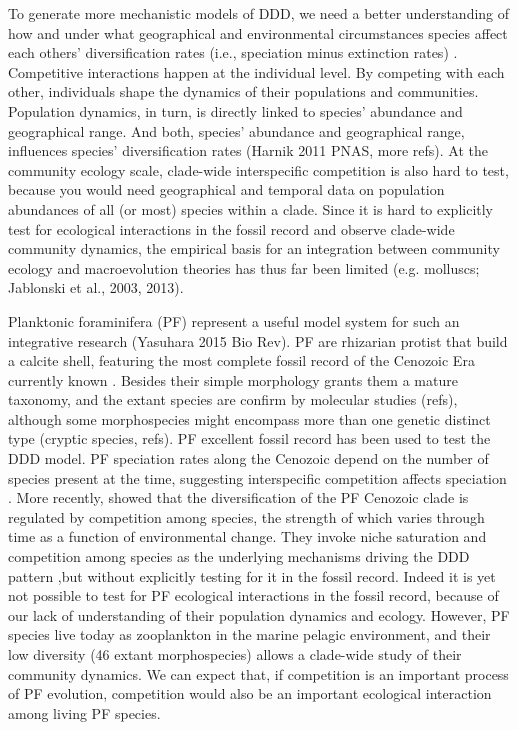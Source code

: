 To generate more mechanistic models of DDD, we need a better understanding of how and under what geographical and environmental circumstances species affect each others' diversification rates (i.e., speciation minus extinction rates) \citep{weber2017evolution}.  
Competitive interactions happen at the individual level. By competing with each other, individuals shape the dynamics of their populations and communities. Population dynamics, in turn, is directly linked to species' abundance and geographical range. And both, species' abundance and geographical range, influences species' diversification rates (Harnik 2011 PNAS, more refs). 
At the community ecology scale, clade-wide interspecific competition is also hard to test, because you would need geographical and temporal data on population abundances of all (or most) species within a clade. 
Since it is hard to explicitly test for ecological interactions in the fossil record and observe clade-wide community dynamics, the empirical basis for an integration between community ecology and macroevolution theories has thus far been limited (e.g. molluscs; Jablonski et al., 2003, 2013).



Planktonic foraminifera (PF) represent a useful model system for such an integrative research (Yasuhara 2015 Bio Rev). PF are rhizarian protist that build a calcite shell, featuring the most complete fossil record of the Cenozoic Era currently known \citep{kucera2007chapter, ezard2011interplay}. Besides their simple morphology grants them a mature taxonomy, and the extant species are confirm by molecular studies (refs), although some morphospecies might encompass more than one genetic distinct type (cryptic species, refs). 
PF excellent fossil record has been used to test the DDD model. PF speciation rates along the Cenozoic depend on the number of species present at the time, suggesting interspecific competition affects speciation \cite{ezard2011interplay}. %
More recently, \cite{ezard2016ecolet} showed that the diversification of the PF Cenozoic clade is regulated by competition among species, the strength of which varies through time as a function of environmental change. They invoke niche saturation and competition among species as the underlying mechanisms driving the DDD pattern ,but without explicitly testing for it in the fossil record.
Indeed it is yet not possible to test for PF ecological interactions in the fossil record, because of our lack of understanding of their population dynamics and ecology.
However, PF species live today as zooplankton in the marine pelagic environment, and their low diversity (46 extant morphospecies) allows a clade-wide study of their community dynamics.  
We can expect that, if competition is an important process of PF evolution, competition would also be an important ecological interaction among living PF species. 

